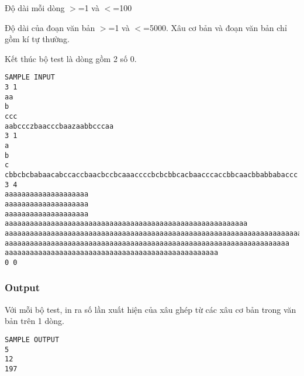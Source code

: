    Độ dài mỗi dòng $>$=1 và $<$=100  

   Độ dài của đoạn văn bản $>$=1 và $<$=5000. Xâu cơ bản và đoạn văn bản chỉ gồm kí tự thường.  

   Kết thúc bộ test là dòng gồm 2 số 0.  
\begin{verbatim}
SAMPLE INPUT
3 1
aa
b
ccc
aabccczbaacccbaazaabbcccaa
3 1
a
b
c
cbbcbcbabaacabccaccbaacbccbcaaaccccbcbcbbcacbaacccaccbbcaacbbabbabaccc
3 4
aaaaaaaaaaaaaaaaaaaa
aaaaaaaaaaaaaaaaaaaa
aaaaaaaaaaaaaaaaaaaa
aaaaaaaaaaaaaaaaaaaaaaaaaaaaaaaaaaaaaaaaaaaaaaaaaaaaaaaaaa
aaaaaaaaaaaaaaaaaaaaaaaaaaaaaaaaaaaaaaaaaaaaaaaaaaaaaaaaaaaaaaaaaaaaaaaaaaaaaaa
aaaaaaaaaaaaaaaaaaaaaaaaaaaaaaaaaaaaaaaaaaaaaaaaaaaaaaaaaaaaaaaaaaaa
aaaaaaaaaaaaaaaaaaaaaaaaaaaaaaaaaaaaaaaaaaaaaaaaaaa
0 0

\end{verbatim}

\subsubsection{   Output  }



   Với mỗi bộ test, in ra số lần xuất hiện của xâu ghép từ các xâu cơ bản trong văn bản trên 1 dòng.  
\begin{verbatim}
SAMPLE OUTPUT
5
12
197
\end{verbatim}